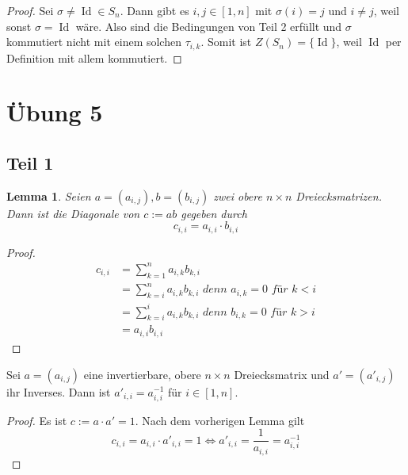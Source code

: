 \documentclass[10pt,a4paper]{article}
\DeclareMathOperator{\id}{Id}
\newtheorem{lemma}{Lemma}
\begin{document}
\begin{proof}
  Sei $\sigma \ne \id \in S_{n}$.
  Dann gibt es $i, j \in [1, n]$ mit $\sigma(i) = j$ und $i \ne j$, weil sonst $\sigma = \id$ wäre.
  Also sind die Bedingungen von Teil 2 erfüllt und $\sigma$ kommutiert nicht mit einem solchen $\tau_{i, k}$.
  Somit ist $Z(S_{n}) = \{ \id \}$, weil $\id$ per Definition mit allem kommutiert.
\end{proof}

\section{Übung 5}

\subsection{Teil 1}

\begin{lemma}
  Seien $a = (a_{i, j}), b = (b_{i, j})$ zwei obere $n \times n$ Dreiecksmatrizen.
  Dann ist die Diagonale von $c := ab$ gegeben durch
  \begin{equation}
    c_{i, i} = a_{i, i} \cdot b_{i, i}
  \end{equation}
\end{lemma}

\begin{proof}
  \begin{align*}
    c_{i, i} & = \sum_{k = 1}^{n} a_{i, k} b_{k, i}\\
    & = \sum_{k = i}^{n} a_{i, k} b_{k, i}\textit{ denn $a_{i, k} = 0$ für $k < i$}\\
    & = \sum_{k = i}^{i} a_{i, k} b_{k, i}\textit{ denn $b_{i, k} = 0$ für $k > i$}\\
    & = a_{i, i} b_{i, i}
  \end{align*}
\end{proof}

\begin{corollary}
  Sei $a = (a_{i, j})$ eine invertierbare, obere $n \times n$ Dreiecksmatrix und $a' = (a'_{i, j})$ ihr Inverses.
  Dann ist $a'_{i, i} = a_{i, i}^{-1}$ für $i \in [1, n]$.
\end{corollary}

\begin{proof}
  Es ist $c := a \cdot a' = 1$.
  Nach dem vorherigen Lemma gilt
  \begin{equation}
    c_{i, i} = a_{i, i} \cdot a'_{i, i} = 1 \Leftrightarrow a'_{i, i} = \frac{1}{a_{i, i}} = a_{i, i}^{-1}
  \end{equation}
\end{proof}
\end{document}
